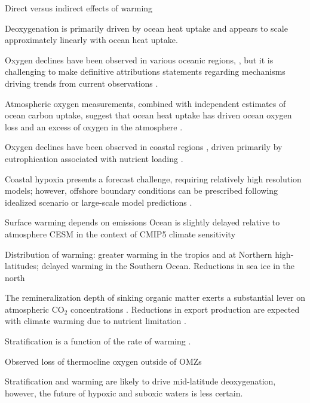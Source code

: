 \documentclass[draft,linenumbers]{report_chapter}
\begin{document}
	Direct versus indirect effects of warming

	Deoxygenation is primarily driven by ocean heat uptake \citep{Plattner-Joos-etal-2002,Bopp-Quere-etal-2002,Keeling-Kortzinger-etal-2010} and appears to scale approximately linearly with ocean heat uptake.

	Oxygen declines have been observed in various oceanic regions, \citep{Stramma-Johnson-etal-2008}, but it is challenging to make definitive attributions statements regarding mechanisms driving trends from current observations \citep{Long-Deutsch-etal-2016}.

	Atmospheric oxygen measurements, combined with independent estimates of ocean carbon uptake, suggest that ocean heat uptake has driven ocean oxygen loss and an excess of oxygen in the atmosphere \citep{Manning-Keeling-2006,Keeling-Manning-2014}.


	Oxygen declines have been observed in coastal regions \citep{Gilbert-Rabalais-etal-2010}, driven primarily by eutrophication associated with nutrient loading \citep{Rabalais-Diaz-etal-2010}.

	 Coastal hypoxia presents a forecast challenge, requiring relatively high resolution models; however, offshore boundary conditions can be prescribed following idealized scenario or large-scale model predictions \citep{Bianucci-Fennel-etal-2016}.

	Surface warming depends on emissions \citep{reference}
	Ocean is slightly delayed relative to atmosphere
	CESM in the context of CMIP5 climate sensitivity

	Distribution of warming: greater warming in the tropics and at Northern high-latitudes; delayed warming in the Southern Ocean.
	Reductions in sea ice in the north

	The remineralization depth of sinking organic matter exerts a substantial lever on atmospheric CO$_2$ concentrations \citep{Kwon-Primeau-etal-2009}.
	Reductions in export production are expected with climate warming due to nutrient limitation \citep{Steinacher-Joos-etal-2010}.

	Stratification is a function of the rate of warming \citep{Capotondi-Alexander-etal-2012}.

	Observed loss of thermocline oxygen outside of OMZs \citep{Stramma-Oschlies-etal-2012,Helm-Bindoff-etal-2011}

	Stratification and warming are likely to drive mid-latitude deoxygenation, however, the future of hypoxic and suboxic waters is less certain.
\end{document}
